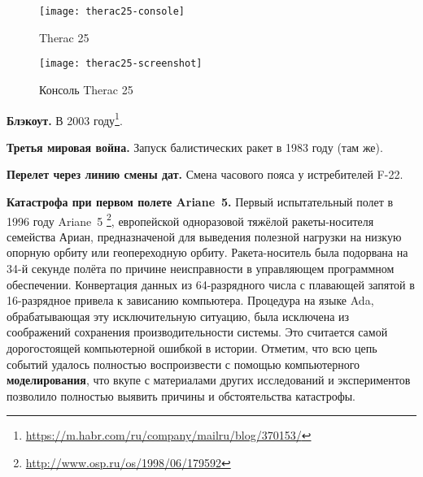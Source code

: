\begin{center}
    \begin{figure}[hb!]
        \texttt{[image: therac25-console]}
        \caption{Therac 25}\label{fig:therac25}
        \texttt{[image: therac25-screenshot]}
        \caption{Консоль Therac 25}\label{fig:therac25_console}
    \end{figure}
\end{center}
    
    
\textbf{Блэкоут.}
В 2003 году\footnote{\url{https://m.habr.com/ru/company/mailru/blog/370153/}}.


\textbf{Третья мировая война.} %
Запуск балистических ракет в 1983 году (там же).


\textbf{Перелет через линию смены дат.}
Смена часового пояса у истребителей F-22. 


\textbf{Катастрофа при первом полете Ariane~5.}
Первый испытательный полет в 1996 году Ariane~5 \cite{journal:open_system:1998_adjaev}\footnote{\url{http://www.osp.ru/os/1998/06/179592}},
европейской одноразовой тяжёлой ракеты-носителя семейства Ариан,
предназначеной для выведения полезной нагрузки на низкую опорную орбиту или геопереходную орбиту. 
%
Ракета-носитель была подорвана на 34-й секунде полёта по причине неисправности в управляющем программном обеспечении.
Конвертация данных из 64-разрядного числа с плавающей запятой в 16-разрядное привела к зависанию компьютера.
Процедура на языке Ada, обрабатывающая эту исключительную ситуацию, была исключена из соображений сохранения производительности системы.
%
Это считается самой дорогостоящей компьютерной ошибкой в истории.
Отметим, что всю цепь событий удалось полностью воспроизвести с помощью компьютерного \textbf{моделирования},
что вкупе с материалами других исследований и экспериментов позволило полностью выявить причины и обстоятельства катастрофы.